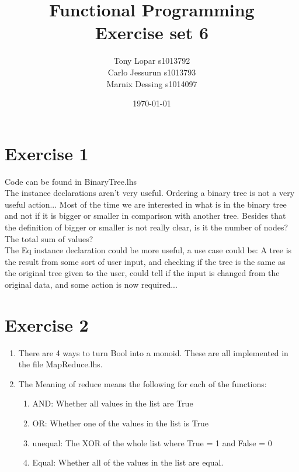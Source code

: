 \documentclass{article}
\begin{document}
\title{Functional Programming \\ Exercise set 6}
\date{\today}
\author{Tony Lopar s1013792 \\ Carlo Jessurun s1013793 \\ Marnix Dessing s1014097}
\maketitle

\section*{Exercise 1}
Code can be found in BinaryTree.lhs\\
The instance declarations aren't very useful. Ordering a binary tree is not a very useful action... Most of the time we are interested in what is in the binary tree and not if it is bigger or smaller in comparison with another tree. Besides that the definition of bigger or smaller is not really clear, is it the number of nodes? The total sum of values?\\
The Eq instance declaration could be more useful, a use case could be: A tree is the result from some sort of user input, and checking if the tree is the same as the original tree given to the user, could tell if the input is changed from the original data, and some action is now required...

\section*{Exercise 2}
\begin{enumerate}
  \item There are 4 ways to turn Bool into a monoid. These are all implemented in the file MapReduce.lhs.
  \item The Meaning of reduce means the following for each of the functions:
  \begin{enumerate}[label=\roman*)]
  \item AND: Whether all values in the list are True
  \item OR: Whether one of the values in the list is True
  \item unequal: The XOR of the whole list where True = 1 and False = 0
  \item Equal: Whether all of the values in the list are equal.
  \end{enumerate}
\end{enumerate}
\end{document}
